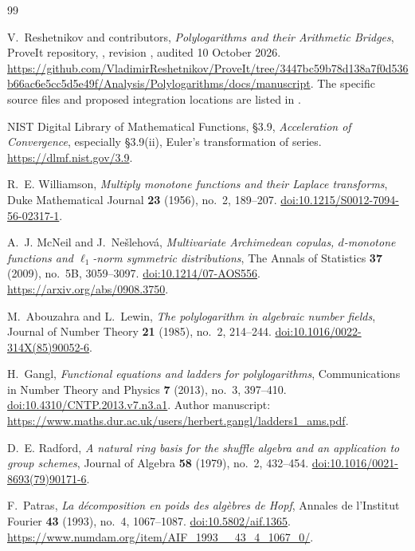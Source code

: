 \begin{thebibliography}{99}

V.~Reshetnikov and contributors,
\emph{Polylogarithms and their Arithmetic Bridges}, ProveIt repository,
, revision
\baseline, audited 10 October 2026.
\url{https://github.com/VladimirReshetnikov/ProveIt/tree/3447bc59b78d138a7f0d536b66ac6e5cc5d5e49f/Analysis/Polylogarithms/docs/manuscript}.
The specific source files and proposed integration locations are listed
in .

NIST Digital Library of Mathematical Functions,
\S3.9, \emph{Acceleration of Convergence}, especially
\S3.9(ii), Euler's transformation of series.
\url{https://dlmf.nist.gov/3.9}.

R.~E. Williamson,
\emph{Multiply monotone functions and their Laplace transforms},
Duke Mathematical Journal \textbf{23} (1956), no.~2, 189--207.
\href{https://doi.org/10.1215/S0012-7094-56-02317-1}{doi:10.1215/S0012-7094-56-02317-1}.

A.~J. McNeil and J.~Ne\v{s}lehov\'a,
\emph{Multivariate Archimedean copulas, $d$-monotone functions and
$\ell_1$-norm symmetric distributions},
The Annals of Statistics \textbf{37} (2009), no.~5B, 3059--3097.
\href{https://doi.org/10.1214/07-AOS556}{doi:10.1214/07-AOS556}.
\url{https://arxiv.org/abs/0908.3750}.

M.~Abouzahra and L.~Lewin,
\emph{The polylogarithm in algebraic number fields},
Journal of Number Theory \textbf{21} (1985), no.~2, 214--244.
\href{https://doi.org/10.1016/0022-314X(85)90052-6}{doi:10.1016/0022-314X(85)90052-6}.

H.~Gangl, \emph{Functional equations and ladders for polylogarithms},
Communications in Number Theory and Physics \textbf{7} (2013), no.~3,
397--410.
\href{https://doi.org/10.4310/CNTP.2013.v7.n3.a1}{doi:10.4310/CNTP.2013.v7.n3.a1}.
Author manuscript:
\url{https://www.maths.dur.ac.uk/users/herbert.gangl/ladders1_ams.pdf}.

D.~E. Radford,
\emph{A natural ring basis for the shuffle algebra and an application
to group schemes}, Journal of Algebra \textbf{58} (1979), no.~2,
432--454.
\href{https://doi.org/10.1016/0021-8693(79)90171-6}{doi:10.1016/0021-8693(79)90171-6}.

F.~Patras, \emph{La d\'ecomposition en poids des alg\`ebres de Hopf},
Annales de l'Institut Fourier \textbf{43} (1993), no.~4, 1067--1087.
\href{https://doi.org/10.5802/aif.1365}{doi:10.5802/aif.1365}.
\url{https://www.numdam.org/item/AIF_1993__43_4_1067_0/}.

\end{thebibliography}
